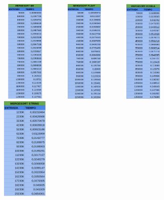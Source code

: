 \documentclass[11pt]{article}
\begin{document}
\begin{figure}[H]
    \begin{minipage}{0.5\textwidth}
        \centering
        \includegraphics[width=3cm, height=5cm]{assets/Img/mergesorttabla1.png}

    \end{minipage}%
    \begin{minipage}{0.5\textwidth}
        \centering
        \includegraphics[width=3cm, height=5cm]{assets/Img/mergesorttabla2.png}

    \end{minipage}
    \begin{minipage}{0.5\textwidth}
        \centering
        \includegraphics[width=3cm, height=5cm]{assets/Img/mergesorttabla3.png}

    \end{minipage}
    \begin{minipage}{0.5\textwidth}
        \centering
        \includegraphics[width=3cm, height=5cm]{assets/Img/mergesorttabla4.png}
    \end{minipage}
\end{figure}
\end{document}
